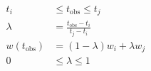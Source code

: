 \documentclass[border=7pt]{standalone}
\begin{document}
\color{ink}
$\displaystyle \begin{aligned}t_i&\leq t_{\mathrm{obs}}\leq t_j\\ \lambda&=\frac{t_{\mathrm{obs}}-t_i}{t_j-t_i}\\ w(t_{\mathrm{obs}})&=(1-\lambda)w_i+\lambda w_j\\ 0&\leq\lambda\leq1\end{aligned}$
\end{document}
